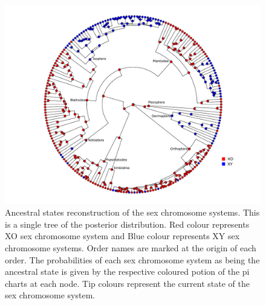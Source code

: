 \newpage
\begin{figure}
\centering \includegraphics[width=1\textwidth]{figures/sex_chrom_asr_phylogeny.pdf}
\caption{Ancestral states reconstruction of the sex chromosome systems. This is a single tree of the posterior distribution. Red colour represents XO sex chromosome system and Blue colour represents XY sex chromosome systems. Order names are marked at the origin of each order. The probabilities of each sex chromosome system as being the ancestral state is given by the respective coloured potion of the pi charts at each node. Tip colours represent the current state of the sex chromosome system.}
\label{fig:sex.asr.plot}
\end{figure}